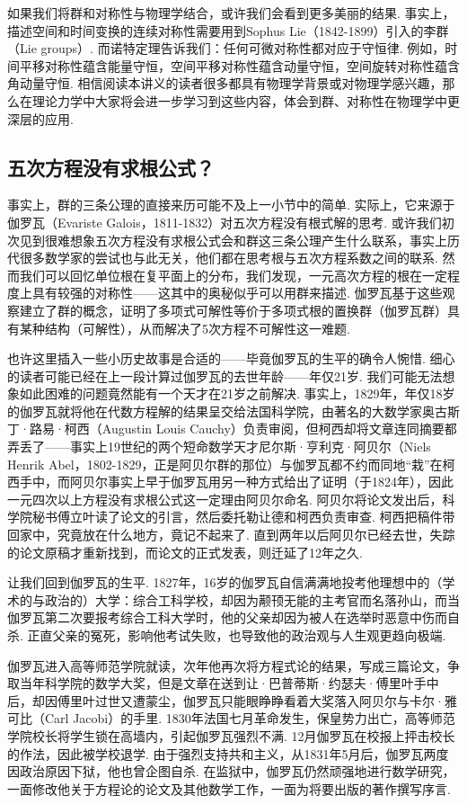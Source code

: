 如果我们将群和对称性与物理学结合，或许我们会看到更多美丽的结果. 事实上，描述空间和时间变换的连续对称性需要用到Sophus Lie（1842-1899）引入的李群（Lie groups）. 而诺特定理告诉我们：任何可微对称性都对应于守恒律. 例如，时间平移对称性蕴含能量守恒，空间平移对称性蕴含动量守恒，空间旋转对称性蕴含角动量守恒. 相信阅读本讲义的读者很多都具有物理学背景或对物理学感兴趣，那么在理论力学中大家将会进一步学习到这些内容，体会到群、对称性在物理学中更深层的应用.

\subsection*{五次方程没有求根公式？}
事实上，群的三条公理的直接来历可能不及上一小节中的简单. 实际上，它来源于伽罗瓦（Evariste Galois，1811-1832）对五次方程没有根式解的思考. 或许我们初次见到很难想象五次方程没有求根公式会和群这三条公理产生什么联系，事实上历代很多数学家的尝试也与此无关，他们都在思考根与五次方程系数之间的联系. 然而我们可以回忆单位根在复平面上的分布，我们发现，一元高次方程的根在一定程度上具有较强的对称性——这其中的奥秘似乎可以用群来描述. 伽罗瓦基于这些观察建立了群的概念，证明了多项式可解性等价于多项式根的置换群（伽罗瓦群）具有某种结构（可解性），从而解决了5次方程不可解性这一难题.

也许这里插入一些小历史故事是合适的——毕竟伽罗瓦的生平的确令人惋惜. 细心的读者可能已经在上一段计算过伽罗瓦的去世年龄——年仅21岁. 我们可能无法想象如此困难的问题竟然能有一个天才在21岁之前解决. 事实上，1829年，年仅18岁的伽罗瓦就将他在代数方程解的结果呈交给法国科学院，由著名的大数学家奥古斯丁·路易·柯西（Augustin Louis Cauchy）负责审阅，但柯西却将文章连同摘要都弄丢了——事实上19世纪的两个短命数学天才尼尔斯·亨利克·阿贝尔（Niels Henrik Abel，1802-1829，正是阿贝尔群的那位）与伽罗瓦都不约而同地``栽''在柯西手中，而阿贝尔事实上早于伽罗瓦用另一种方式给出了证明（于1824年），因此一元四次以上方程没有求根公式这一定理由阿贝尔命名. 阿贝尔将论文发出后，科学院秘书傅立叶读了论文的引言，然后委托勒让德和柯西负责审查. 柯西把稿件带回家中，究竟放在什么地方，竟记不起来了. 直到两年以后阿贝尔已经去世，失踪的论文原稿才重新找到，而论文的正式发表，则迁延了12年之久.

让我们回到伽罗瓦的生平. 1827年，16岁的伽罗瓦自信满满地投考他理想中的（学术的与政治的）大学：综合工科学校，却因为颟顸无能的主考官而名落孙山，而当伽罗瓦第二次要报考综合工科大学时，他的父亲却因为被人在选举时恶意中伤而自杀. 正直父亲的冤死，影响他考试失败，也导致他的政治观与人生观更趋向极端.

伽罗瓦进入高等师范学院就读，次年他再次将方程式论的结果，写成三篇论文，争取当年科学院的数学大奖，但是文章在送到让·巴普蒂斯·约瑟夫·傅里叶手中后，却因傅里叶过世又遭蒙尘，伽罗瓦只能眼睁睁看着大奖落入阿贝尔与卡尔·雅可比（Carl Jacobi）的手里. 1830年法国七月革命发生，保皇势力出亡，高等师范学院校长将学生锁在高墙内，引起伽罗瓦强烈不满. 12月伽罗瓦在校报上抨击校长的作法，因此被学校退学. 由于强烈支持共和主义，从1831年5月后，伽罗瓦两度因政治原因下狱，他也曾企图自杀. 在监狱中，伽罗瓦仍然顽强地进行数学研究，一面修改他关于方程论的论文及其他数学工作，一面为将要出版的著作撰写序言.

